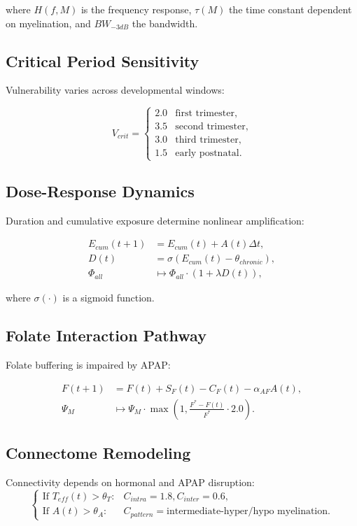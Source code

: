\documentclass[12pt]{article}
\begin{document}
where $H(f,M)$ is the frequency response, $\tau(M)$ the time constant dependent on myelination, and $BW_{-3dB}$ the bandwidth.

\subsection{Critical Period Sensitivity}
Vulnerability varies across developmental windows:

\[
V_{crit} = \begin{cases}
2.0 & \text{first trimester}, \\
3.5 & \text{second trimester}, \\
3.0 & \text{third trimester}, \\
1.5 & \text{early postnatal}.
\end{cases}
\]

\subsection{Dose-Response Dynamics}
Duration and cumulative exposure determine nonlinear amplification:

\begin{align}
E_{cum}(t+1) &= E_{cum}(t) + A(t)\Delta t, \\
D(t) &= \sigma\left(E_{cum}(t) - \theta_{chronic}\right), \\
\Phi_{all} &\mapsto \Phi_{all} \cdot (1 + \lambda D(t)),
\end{align}

where $\sigma(\cdot)$ is a sigmoid function.

\subsection{Folate Interaction Pathway}
Folate buffering is impaired by APAP:

\begin{align}
F(t+1) &= F(t) + S_F(t) - C_F(t) - \alpha_{AF}A(t), \\
\Psi_M &\mapsto \Psi_M \cdot \max\left(1, \frac{F^* - F(t)}{F^*} \cdot 2.0\right).
\end{align}

\subsection{Connectome Remodeling}
Connectivity depends on hormonal and APAP disruption:
\[
\begin{cases}
\text{If } T_{eff}(t) > \theta_T: & C_{intra} = 1.8, C_{inter} = 0.6, \\
\text{If } A(t) > \theta_A: & C_{pattern} = \text{intermediate-hyper/hypo myelination}.
\end{cases}
\]
\end{document}

